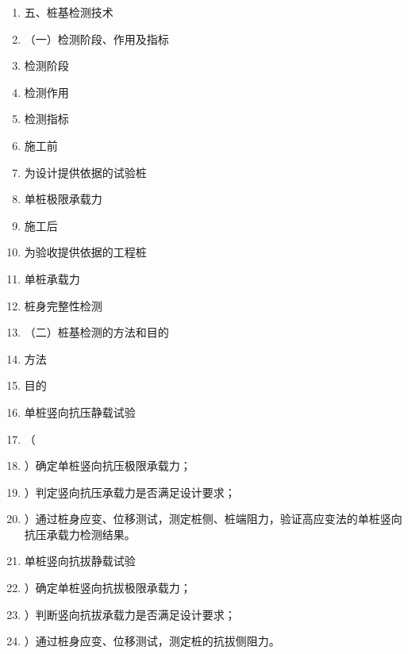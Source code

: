 \documentclass[UTF8,fontset=fandol,11pt]{ctexart}
\begin{document}
\begin{enumerate}[label=\arabic*.]

\item 五、桩基检测技术

\item （一）检测阶段、作用及指标

\item 检测阶段

\item 检测作用

\item 检测指标

\item 施工前

\item 为设计提供依据的试验桩

\item 单桩极限承载力

\item 施工后

\item 为验收提供依据的工程桩

\item 单桩承载力

\item 桩身完整性检测

\item （二）桩基检测的方法和目的

\item 方法

\item 目的

\item 单桩竖向抗压静载试验

\item （

\item ）确定单桩竖向抗压极限承载力；

\item ）判定竖向抗压承载力是否满足设计要求；

\item ）通过桩身应变、位移测试，测定桩侧、桩端阻力，验证高应变法的单桩竖向抗压承载力检测结果。

\item 单桩竖向抗拔静载试验

\item ）确定单桩竖向抗拔极限承载力；

\item ）判断竖向抗拔承载力是否满足设计要求；

\item ）通过桩身应变、位移测试，测定桩的抗拔侧阻力。

\end{enumerate}
\end{document}
